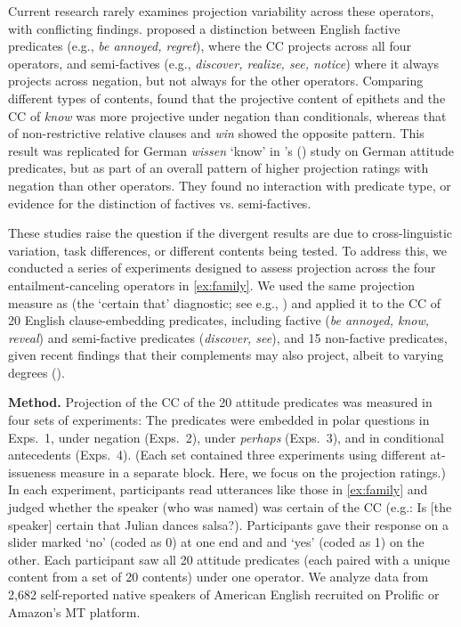 \documentclass[12pt, a4paper]{article}
\newcommand{\posscite}[1]{\citeauthor{#1}'s (\citeyear{#1})}
\begin{document}
	\vspace{-.5\baselineskip}
	\noindent  Current research rarely examines projection variability across these operators, with conflicting findings.
	\citet{karttunen_observations_1971} proposed a distinction between English factive predicates (e.g., \emph{be annoyed, regret}), where the CC projects across all four operators, and semi-factives (e.g., \emph{discover, realize, see, notice}) where it always projects across negation, but not always for the other operators.
	Comparing different types of contents, \citet{smith_relationship_2014} found that the projective content of epithets and the CC of \emph{know} was more projective under negation than conditionals,
	whereas that of non-restrictive relative clauses and \emph{win} showed the opposite pattern.
	This result was replicated for German \emph{wissen} `know' in \posscite{sieker_projective_2022} study on German attitude predicates, but as part of an overall pattern of higher projection ratings with negation than other operators. They found no interaction with predicate type, or evidence for the distinction of factives vs. semi-factives.
	
	These studies raise the question if the divergent results are due to cross-linguistic variation, task differences, or different contents being tested. To address this, we conducted a series of experiments designed to assess projection across the four entailment-canceling operators in \ref{ex:family}. We used the same projection measure as \citet{sieker_projective_2022} (the `certain that' diagnostic; see e.g., \citealp{tonhauser_how_2018,djarv_prosodic_2017,mahler_social_2020}) and applied it to the CC of 20 English clause-embedding predicates, including factive (\emph{be annoyed, know, reveal}) and semi-factive predicates (\emph{discover, see}),
	and 15 non-factive predicates, given recent findings that their complements may also project, albeit to varying degrees (\citealt{degen_are_2022}).


\noindent 
{\bf Method.}
	Projection of the CC of the 20 attitude predicates was measured in four sets of experiments: The predicates were embedded in polar questions in Exps.\ 1, under negation (Exps.\ 2), under {\em perhaps} (Exps.\ 3), and in conditional antecedents (Exps.\ 4). (Each set contained three experiments using different at-issueness measure in a separate block. Here, we focus on the projection ratings.)
	In each experiment, participants read utterances like those in \ref{ex:family} and judged whether the speaker (who was named) was certain of the CC (e.g.: Is [the speaker] certain that Julian dances salsa?). Participants gave their response on a slider marked `no' (coded as 0) at one end and and `yes' (coded as 1) on the other. Each participant saw all 20 attitude predicates (each paired with a unique content from a set of 20 contents) under one operator. We analyze data from 2,682 self-reported native speakers of American English recruited on Prolific or Amazon's MT platform.
\end{document}
